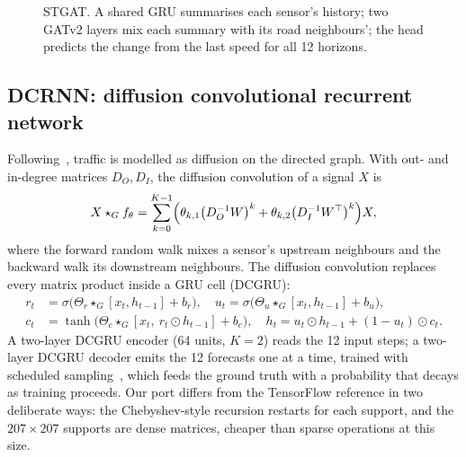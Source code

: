 \documentclass[11pt,a4paper]{article}
\begin{document}
\begin{figure}[htbp]
\centering
{}
\caption{STGAT. A shared GRU summarises each sensor's history; two GATv2 layers mix each summary with its road
neighbours'; the head predicts the change from the last speed for all 12 horizons.}
\label{fig:stgat}
\end{figure}

\subsection{DCRNN: diffusion convolutional recurrent network}\label{sec:dcrnn}
Following~\citep{li2018dcrnn}, traffic is modelled as diffusion on the directed graph. With out- and in-degree matrices
$D_O, D_I$, the diffusion convolution of a signal $X$ is
\begin{equation}
X \star_{G} f_\theta = \sum_{k=0}^{K-1}\Bigl(\theta_{k,1}\bigl(D_O^{-1}W\bigr)^k + \theta_{k,2}\bigl(D_I^{-1}W^{\top}\bigr)^k\Bigr)X ,
\end{equation}
where the forward random walk mixes a sensor's upstream neighbours and the backward walk its downstream neighbours. The
diffusion convolution replaces every matrix product inside a GRU cell (DCGRU):
\begin{align}
r_t &= \sigma\bigl(\Theta_r\star_G[x_t,h_{t-1}] + b_r\bigr), \quad u_t = \sigma\bigl(\Theta_u\star_G[x_t,h_{t-1}] + b_u\bigr),\\
c_t &= \tanh\bigl(\Theta_c\star_G[x_t,\ r_t\odot h_{t-1}] + b_c\bigr), \quad h_t = u_t\odot h_{t-1} + (1-u_t)\odot c_t .
\end{align}
A two-layer DCGRU encoder (64 units, $K=2$) reads the 12 input steps; a two-layer DCGRU decoder emits the 12 forecasts
one at a time, trained with scheduled sampling~\citep{bengio2015scheduled}, which feeds the ground truth with a
probability that decays as training proceeds. Our port differs from the TensorFlow reference in two deliberate ways: the
Chebyshev-style recursion restarts for each support, and the $207\times207$ supports are dense matrices, cheaper than
sparse operations at this size.
\end{document}
